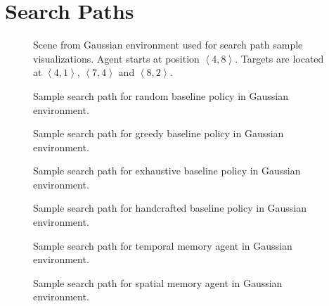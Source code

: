 \chapter{Search Paths}
\label{app:paths}

\begin{figure}
    \centering
    
    \caption[Scene for search paths]{Scene from Gaussian environment used for search path sample visualizations. Agent starts at position \(\left\langle 4, 8 \right\rangle\). Targets are located at \(\left\langle 4, 1 \right\rangle\), \(\left\langle 7, 4 \right\rangle\) and \(\left\langle 8, 2 \right\rangle\).}
    \label{fig:path-scene}
\end{figure}    

\begin{figure}
    \centering
    
    \caption[Random baseline search path]{Sample search path for random baseline policy in Gaussian environment.}
    \label{fig:path-random}
\end{figure}

\begin{figure}
    \centering
    
    \caption[Greedy baseline search path]{Sample search path for greedy baseline policy in Gaussian environment.}
    \label{fig:path-greedy}
\end{figure}

\begin{figure}
    \centering
    
    \caption[Exhaustive baseline search path]{Sample search path for exhaustive baseline policy in Gaussian environment.}
    \label{fig:path-exhaustive}
\end{figure}

\begin{figure}
    \centering
    
    \caption[Handcrafted baseline search path]{Sample search path for handcrafted baseline policy in Gaussian environment.}
    \label{fig:path-handcrafted}
\end{figure}

\begin{figure}
    \centering
    
    \caption[Temporal memory agent search path]{Sample search path for temporal memory agent in Gaussian environment.}
    \label{fig:path-lstm}
\end{figure}

\begin{figure}
    \centering
    
    \caption[Spatial memory agent search path]{Sample search path for spatial memory agent in Gaussian environment.}
    \label{fig:path-map}
\end{figure}